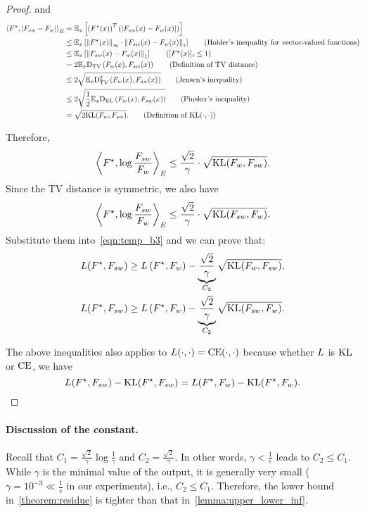 \begin{proof}
and
\begin{align*}
    \left \langle F^\star, \left\vert F_{sw}-F_w \right\vert \right \rangle_E & = \expect_x \left[ \left(F^\star(x)\right)^T \left( \left|F_{sw}(x)-F_w(x)\right| \right) \right] \\
    & \le \expect_x \left[ \left\| F^\star(x) \right\|_\infty \cdot \left\| F_{sw}(x)-F_w(x) \right\|_1 \right] \tag{Holder’s inequality for vector-valued functions} \\ 
    & \le \expect_x \left[ \left\| F_{sw}(x)-F_w(x) \right\|_1 \right] \tag{$[F^\star(x)]_i \le 1$} \\ 
    & = 2 \expect_x \tv \left( F_w(x), F_{sw}(x) \right) \tag{Definition of TV distance} \\
    & \le 2 \sqrt{\expect_x \tv^2 \left( F_w(x), F_{sw}(x) \right)} \tag{Jensen’s inequality} \\ 
    & \le 2 \sqrt{\frac{1}{2}\expect_x \mathrm{D}_{\mathrm{KL}} \left( F_w(x), F_{sw}(x) \right)} \tag{Pinsker’s inequality} \\ 
    & = \sqrt{2\kl(F_w, F_{sw})}. \tag{Definition of $\kl(\cdot, \cdot)$}
\end{align*}

Therefore, 
$$\left \langle F^\star, \log{\frac{F_{sw}}{F_w}} \right \rangle_E \le \frac{\sqrt{2}}{\gamma} \cdot \sqrt{\mathrm{KL}(F_w, F_{sw})}.$$
Since the TV distance is symmetric, we also have
$$\left \langle F^\star, \log{\frac{F_{sw}}{F_w}} \right \rangle_E \le \frac{\sqrt{2}}{\gamma} \cdot \sqrt{\mathrm{KL}(F_{sw}, F_w)}.$$
Substitute them into~\cref{eqn:temp_b3} and we can prove that:
\begin{align*}
    & L(F^\star, F_{sw}) \ge L\left( F^\star, F_w \right) - \underbrace{\frac{\sqrt{2}}{\gamma}}_{C_2} \sqrt{\mathrm{KL}(F_w, F_{sw})}, \\
    & L(F^\star, F_{sw}) \ge L\left( F^\star, F_w \right) - \underbrace{\frac{\sqrt{2}}{\gamma}}_{C_2} \sqrt{\mathrm{KL}(F_{sw}, F_w)}.
\end{align*}

The above inequalities also applies to $L(\cdot, \cdot)=\mathrm{CE}(\cdot, \cdot)$ because whether $L$ is $\mathrm{KL}$ or $\mathrm{CE}$, we have 
$$L(F^\star, F_{sw})-\mathrm{KL}(F^\star, F_{sw}) = L(F^\star, F_{w})-\mathrm{KL}(F^\star, F_{w}).$$

\end{proof}



\paragraph{Discussion of the constant.}
Recall that $C_1 = \frac{\sqrt{2}}{\gamma} \log \frac{1}{\gamma}$ and $C_2 = \frac{\sqrt{2}}{\gamma}$. 
In other words, $\gamma < \frac{1}{e}$ leads to $C_2 \le C_1$.
While $\gamma$ is the minimal value of the output, it is generally very small ($\gamma=10^{-3} \ll \frac{1}{e}$ in our experiments), i.e., $C_2 \le C_1$.
Therefore, the lower bound in~\cref{theorem:residue} is tighter than that in~\cref{lemma:upper_lower_inf}.





